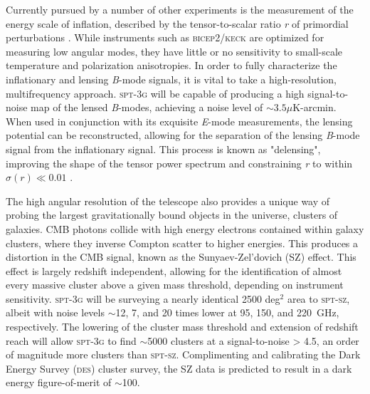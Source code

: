 \documentclass[iop]{emulateapj}
\begin{document}
Currently pursued by a number of other experiments is the measurement of the energy scale of inflation, described by the tensor-to-scalar ratio \textit{r} of primordial perturbations \citep{samtleben_cosmic_2007}.  While instruments such as \textsc{bicep2}/\textsc{keck} are optimized for measuring low angular modes, they have little or no sensitivity to small-scale temperature and polarization anisotropies.  In order to fully characterize the inflationary and lensing \textit{B}-mode signals, it is vital to take a high-resolution, multifrequency approach.  \textsc{spt-3g} will be capable of producing a high signal-to-noise map of the lensed \textit{B}-modes, achieving a noise level of $\sim3.5\mu$K-arcmin.  When used in conjunction with its exquisite \textit{E}-mode measurements, the lensing potential can be reconstructed, allowing for the separation of the lensing \textit{B}-mode signal from the inflationary signal.  This process is known as "delensing", improving the shape of the tensor power spectrum and constraining \textit{r} to within $\sigma(r)\ll0.01$ \citep{benson_spt-3g:_2014}.

The high angular resolution of the telescope also provides a unique way of probing the largest gravitationally bound objects in the universe, clusters of galaxies.  CMB photons collide with high energy electrons contained within galaxy clusters, where they inverse Compton scatter to higher energies.  This produces a distortion in the CMB signal, known as the Sunyaev-Zel'dovich (SZ) effect.  This effect is largely redshift independent, allowing for the identification of almost every massive cluster above a given mass threshold, depending on instrument sensitivity.  \textsc{spt-3g} will be surveying a nearly identical 2500 deg$^2$ area to \textsc{spt-sz}, albeit with noise levels $\sim$12, 7, and 20 times lower at 95, 150, and 220~GHz, respectively.  The lowering of the cluster mass threshold and extension of redshift reach will allow \textsc{spt-3g} to find $\sim$5000 clusters at a signal-to-noise > 4.5, an order of magnitude more clusters than \textsc{spt-sz}.  Complimenting and calibrating the Dark Energy Survey (\textsc{des}) cluster survey, the SZ data is predicted to result in a dark energy figure-of-merit of $\sim$100.


\end{document}
